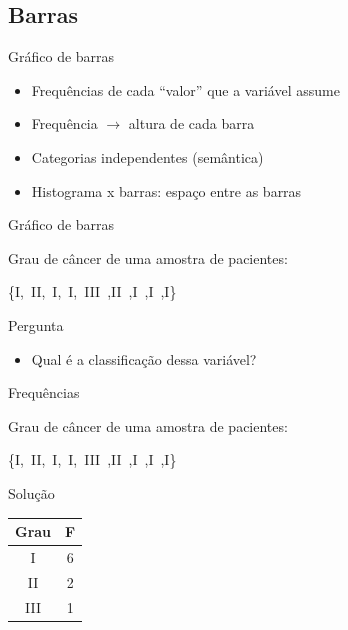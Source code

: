 \documentclass{beamer}
\begin{document}
\subsection{Barras}

\begin{frame}{Gráfico de barras}
  \begin{itemize}
  \item Frequências de cada ``valor'' que a variável assume
  \item Frequência $\rightarrow$ altura de cada barra
  \item Categorias independentes (semântica)
  \item Histograma x barras: \alert{espaço entre as barras}
  \end{itemize}
\end{frame}

\begin{frame}{Gráfico de barras}
  \begin{example}
    Grau de câncer de uma amostra de pacientes:

    \bigskip
    \centering\{I,\ II,\ I,\ I,\ III\ ,II\ ,I\ ,I\ ,I\}
  \end{example}
  \begin{block}{Pergunta}
    \begin{itemize}
    \item Qual é a classificação dessa variável?
    \end{itemize}
  \end{block}
\end{frame}

\begin{frame}{Frequências}
  \begin{example}
    Grau de câncer de uma amostra de pacientes:

    \bigskip
    \centering\{I,\ II,\ I,\ I,\ III\ ,II\ ,I\ ,I\ ,I\}
  \end{example}
  \begin{block}{Solução}
    \centering\begin{tabular}{|c|c|}
      \hline
      Grau & F\\
      \hline
      \hline
      I & 6\\
      \hline
      II & 2\\
      \hline
      III & 1\\
      \hline
    \end{tabular}
  \end{block}
\end{frame}
\end{document}
